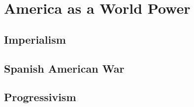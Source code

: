 \chapter{America as a World Power}

\section{Imperialism}

\section{Spanish American War}

\section{Progressivism}
